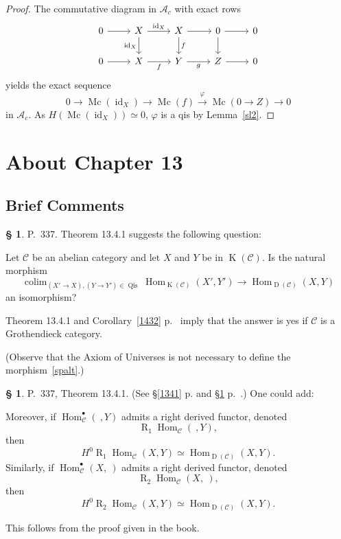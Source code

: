 \documentclass[12pt]{article}%
\theoremstyle{remark}
\theoremstyle{definition}
\newtheorem{s}[thm]{\S}%
\newcommand{\bu}{\bullet}
\newcommand{\oo}{\operatorname}
\newcommand{\A}{\mathcal A}
\newcommand{\C}{\mathcal C}
\newcommand{\pp}{\varphi}
\newcommand{\xr}{\xrightarrow}
\DeclareMathOperator*{\colim}{colim}%
\DeclareMathOperator{\id}{id}
\DeclareMathOperator{\Hom}{Hom}%
\DeclareMathOperator{\Mc}{Mc}
\begin{document}
\begin{proof}
The commutative diagram in $\A_c$ with exact rows 
$$
\begin{tikzcd}
0\ar{r}&X\ar{d}[swap]{\id_X}\ar{r}{\id_X}&X\ar{d}{f}\ar{r}&0\ar{d}\ar{r}&0\\ 
0\ar{r}&X\ar{r}[swap]{f}&Y\ar{r}[swap]{g}&Z\ar{r}&0
\end{tikzcd}
$$ 
yields the exact sequence 
$$
0\to\Mc(\id_X)\to\Mc(f)\xr\pp\Mc(0\to Z)\to0
$$
in $\A_c$. As $H(\Mc(\id_X))\simeq0$, $\pp$ is a qis by Lemma~\ref{sl2}.
\end{proof}


\section{About Chapter 13}

\subsection{Brief Comments}

\begin{s}\label{q337}
P.~337. Theorem 13.4.1 suggests the following question: 

Let $\C$ be an abelian category and let $X$ and $Y$ be in $\oo K(\C)$. Is the natural morphism 
%
\begin{equation}\label{spalt}
\colim_{(X'\to X),(Y\to Y')\in\oo{Qis}}\Hom_{\oo K(\C)}(X',Y')\to\Hom_{\oo D(\C)}(X,Y)
\end{equation}
%
an isomorphism?

Theorem 13.4.1 and Corollary~\ref{1432} p.~\pageref{1432} imply that the answer is yes if $\C$ is a Grothendieck category. 

(Observe that the Axiom of Universes is not necessary to define the morphism~\eqref{spalt}.)
\end{s}

%

\begin{s}
P.~337, Theorem 13.4.1. (See \S\ref{1341} p. \pageref{1341} and \S\ref{q337} p.~\pageref{q337}.) One could add:

Moreover, if $\Hom_\C^\bu(\ ,Y)$ admits a right derived functor, denoted 
$$
\oo R_1\!\Hom_\C(\ ,Y),
$$ 
then 
$$
H^0\oo R_1\!\Hom_\C(X,Y)\simeq\Hom_{\oo D(\C)}(X,Y).
$$ 
Similarly, if $\Hom_\C^\bu(X,\ )$ admits a right derived functor, denoted 
$$
\oo R_2\!\Hom_\C(X,\ ),
$$ 
then 
$$
H^0\oo R_2\!\Hom_\C(X,Y)\simeq\Hom_{\oo D(\C)}(X,Y).
$$

This follows from the proof given in the book. 
\end{s}
\end{document}

